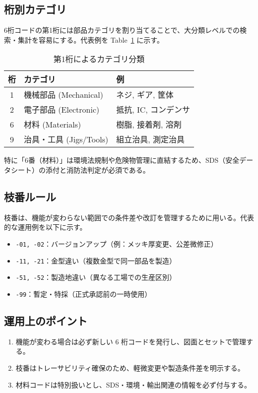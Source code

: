 \documentclass[10pt,conference]{IEEEtran}
\begin{document}
\subsection{桁別カテゴリ}
6桁コードの第1桁には部品カテゴリを割り当てることで、大分類レベルでの検索・集計を容易にする。代表例を Table~\ref{tab:categories} に示す。

\begin{table}[h]
  \centering
  \caption{第1桁によるカテゴリ分類}
  \label{tab:categories}
  \begin{tabular}{cll}
    \hline
    桁 & カテゴリ & 例 \\
    \hline
    1 & 機械部品 (Mechanical) & ネジ, ギア, 筐体 \\
    2 & 電子部品 (Electronic) & 抵抗, IC, コンデンサ \\
    6 & 材料 (Materials) & 樹脂, 接着剤, 溶剤 \\
    9 & 治具・工具 (Jigs/Tools) & 組立治具, 測定治具 \\
    \hline
  \end{tabular}
\end{table}

特に「6番（材料）」は環境法規制や危険物管理に直結するため、SDS（安全データシート）の添付と消防法判定が必須である。

\subsection{枝番ルール}
枝番は、機能が変わらない範囲での条件差や改訂を管理するために用いる。代表的な運用例を以下に示す。

\begin{itemize}
  \item \texttt{-01, -02}：バージョンアップ（例：メッキ厚変更、公差微修正）
  \item \texttt{-11, -21}：金型違い（複数金型で同一部品を製造）
  \item \texttt{-51, -52}：製造地違い（異なる工場での生産区別）
  \item \texttt{-99}：暫定・特採（正式承認前の一時使用）
\end{itemize}

\subsection{運用上のポイント}
\begin{enumerate}
  \item 機能が変わる場合は必ず新しい 6 桁コードを発行し、図面とセットで管理する。  
  \item 枝番はトレーサビリティ確保のため、軽微変更や製造条件差を明示する。  
  \item 材料コードは特別扱いとし、SDS・環境・輸出関連の情報を必ず付与する。  
\end{enumerate}
\end{document}
